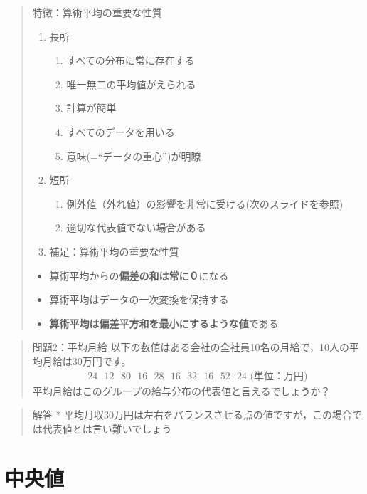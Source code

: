 \documentclass[
]{book}
\providecommand{\tightlist}{%
  \setlength{\itemsep}{0pt}\setlength{\parskip}{0pt}}
\theoremstyle{definition}
\theoremstyle{definition}
\theoremstyle{definition}
\theoremstyle{definition}
\theoremstyle{remark}
\begin{document}
\begin{quote}
特徴：算術平均の重要な性質

\begin{enumerate}
\def\labelenumi{\arabic{enumi}.}
\tightlist
\item
  長所

  \begin{enumerate}
  \item すべての分布に常に存在する
  \item 唯一無二の平均値がえられる
  \item 計算が簡単
  \item すべてのデータを用いる
  \item 意味(=``データの重心'')が明瞭
  \end{enumerate}
\item
  短所

  \begin{enumerate}
  \item 例外値（外れ値）の影響を非常に受ける(次のスライドを参照)
  \item 適切な代表値でない場合がある
  \end{enumerate}
\item
  補足：算術平均の重要な性質
\end{enumerate}

\begin{itemize}
\tightlist
\item
  算術平均からの\textbf{偏差の和は常に０}になる
\item
  算術平均はデータの一次変換を保持する
\item
  \textbf{算術平均は偏差平方和を最小にするような値}である
\end{itemize}
\end{quote}

\begin{quote}
問題2：平均月給
以下の数値はある会社の全社員10名の月給で，10人の平均月給は30万円です。
\begin{align*}
\text{24~~12~~80~~16~~28~~16~~32~~16~~52~~24~(単位：万円)}
\end{align*}
平均月給はこのグループの給与分布の代表値と言えるでしょうか？
\end{quote}

\begin{quote}
解答
* 平均月収30万円は左右をバランスさせる点の値ですが，この場合では代表値とは言い難いでしょう
\end{quote}

\hypertarget{ux4e2dux592eux5024}{%
\section{中央値}\label{ux4e2dux592eux5024}}
\end{document}

